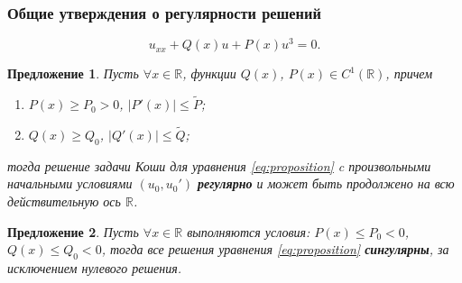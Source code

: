 \documentclass [10pt] {beamer}
\newtheorem{proposition}{Предложение}
\begin{document}
\begin{frame}
	\frametitle{Общие утверждения о регулярности решений}

	\begin{equation}
			u_{xx} + Q(x) u + P(x) u^3 = 0.
			\label{eq:proposition}
		\end{equation}

	\begin{proposition}
		Пусть $\forall x \in \mathbb{R}$, функции $Q(x)$, $P(x) \in C^1(\mathbb{R})$, причем
		\begin{enumerate}
			\item[(а)] $P(x) \ge P_0 > 0$, $|P'(x)| \le \widetilde{P}$;
			\item[(б)] $Q(x) \ge Q_0$, $|Q'(x)| \le \widetilde{Q}$;
		\end{enumerate}
		тогда решение задачи Коши для уравнения \eqref{eq:proposition} c произвольными начальными условиями $(u_0, u_0')$ {\bf регулярно} и может быть продолжено на всю действительную ось $\mathbb{R}$.
		\label{prop:regular}
	\end{proposition}

	\medskip
	
	\begin{proposition}
		Пусть $\forall x \in \mathbb{R}$ выполняются условия: $P(x) \le P_0 < 0$, $Q(x) \le Q_0 < 0$, тогда все решения уравнения \eqref{eq:proposition} {\bf сингулярны}, за исключением нулевого решения.
		\label{prop:singular}
	\end{proposition}
	
\end{frame}
\end{document}

